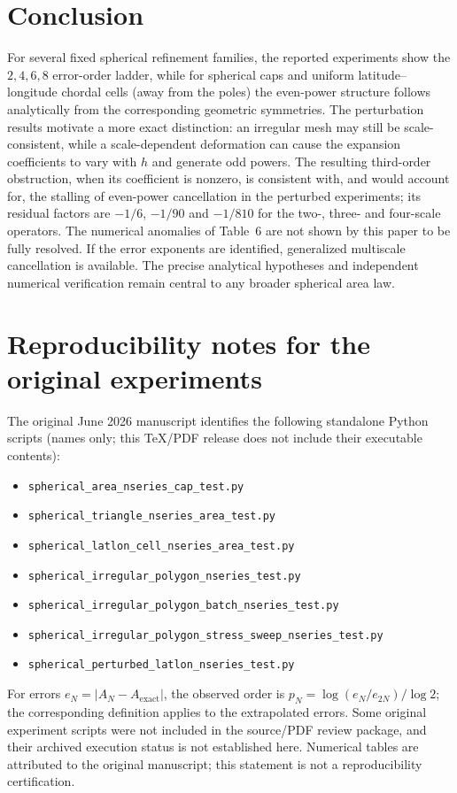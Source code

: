 \documentclass[11pt]{article}
\theoremstyle{remark}
\newcommand{\Aex}{A_{\mathrm{exact}}}
\begin{document}
\section{Conclusion}
For several fixed spherical refinement families, the reported experiments show the
$2,4,6,8$ error-order ladder, while for spherical caps and uniform latitude--longitude chordal cells (away from the poles)
the even-power structure follows analytically from the corresponding geometric symmetries. The perturbation results motivate a more
exact distinction: an irregular mesh may still be scale-consistent, while a scale-dependent
deformation can cause the expansion coefficients to vary with $h$ and generate odd powers. The
resulting third-order obstruction, when its coefficient is nonzero, is consistent with, and
would account for, the stalling of even-power cancellation in the perturbed experiments; its
residual factors are $-1/6$, $-1/90$ and $-1/810$ for the two-, three- and four-scale operators.
The numerical anomalies of Table~6 are not shown by this paper to be fully resolved. If the
error exponents are identified, generalized multiscale cancellation is available. The precise
analytical hypotheses and independent numerical verification remain central to any broader
spherical area law.

\appendix
\section{Reproducibility notes for the original experiments}
The original June 2026 manuscript identifies the following standalone Python scripts (names only; this TeX/PDF release does not include their executable contents):
\begin{itemize}
\item \texttt{spherical\_area\_nseries\_cap\_test.py}
\item \texttt{spherical\_triangle\_nseries\_area\_test.py}
\item \texttt{spherical\_latlon\_cell\_nseries\_area\_test.py}
\item \texttt{spherical\_irregular\_polygon\_nseries\_test.py}
\item \texttt{spherical\_irregular\_polygon\_batch\_nseries\_test.py}
\item \texttt{spherical\_irregular\_polygon\_stress\_sweep\_nseries\_test.py}
\item \texttt{spherical\_perturbed\_latlon\_nseries\_test.py}
\end{itemize}
For errors $e_N=|A_N-\Aex|$, the observed order is $p_N=\log(e_N/e_{2N})/\log2$; the
corresponding definition applies to the extrapolated errors. Some original experiment scripts were not included in the source/PDF review package, and their archived execution status is not established here. Numerical tables are attributed to the original manuscript; this statement is not a reproducibility certification.
\end{document}
